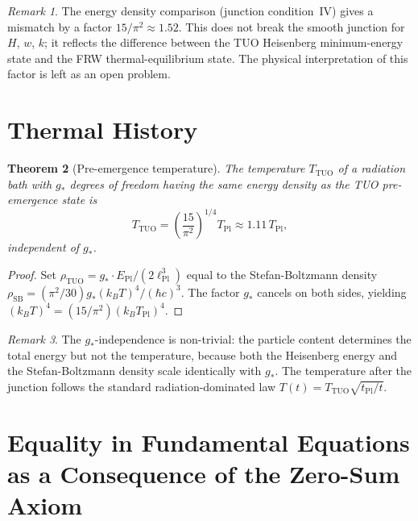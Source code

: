 \documentclass[12pt,a4paper]{article}
\newtheorem{theorem}{Theorem}[section]
\theoremstyle{definition}
\theoremstyle{remark}
\newtheorem{remark}[theorem]{Remark}
\newcommand{\EPl}{E_{\mathrm{Pl}}}
\newcommand{\tPl}{t_{\mathrm{Pl}}}
\newcommand{\lPl}{\ell_{\mathrm{Pl}}}
\newcommand{\TPl}{T_{\mathrm{Pl}}}
\newcommand{\gstar}{g_{*}}
\begin{document}
\begin{remark}
The energy density comparison (junction condition~IV) gives a mismatch
by a factor $15/\pi^2 \approx 1.52$.
This does not break the smooth junction for $H$, $w$, $k$; it reflects
the difference between the TUO Heisenberg minimum-energy state and the
FRW thermal-equilibrium state.
The physical interpretation of this factor is left as an open problem.
\end{remark}

\section{Thermal History}
\label{sec:thermal}

\begin{theorem}[Pre-emergence temperature]\label{thm:T_TUO}
The temperature $T_{\mathrm{TUO}}$ of a radiation bath with $\gstar$ degrees of
freedom having the same energy density as the TUO pre-emergence state is
\begin{equation}
  T_{\mathrm{TUO}} = \left(\frac{15}{\pi^2}\right)^{1/4}\TPl \approx 1.11\,\TPl,
\end{equation}
independent of $\gstar$.
\end{theorem}
\begin{proof}
Set $\rho_\mathrm{TUO} = \gstar \cdot \EPl/(2\lPl^3)$ equal to the
Stefan-Boltzmann density $\rho_\mathrm{SB} = (\pi^2/30)\gstar(k_B T)^4/(\hbar c)^3$.
The factor $\gstar$ cancels on both sides, yielding
$(k_B T)^4 = (15/\pi^2)(k_B\TPl)^4$.
\end{proof}

\begin{remark}
The $\gstar$-independence is non-trivial: the particle content determines the
total energy but not the temperature, because both the Heisenberg energy and
the Stefan-Boltzmann density scale identically with $\gstar$.
The temperature after the junction follows the standard radiation-dominated law
$T(t) = T_{\mathrm{TUO}}\sqrt{\tPl/t}$.
\end{remark}

\section{Equality in Fundamental Equations as a Consequence of the Zero-Sum Axiom}
\label{sec:equalities}
\end{document}
